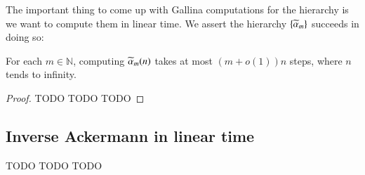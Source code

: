 The important thing to come up with Gallina computations for the hierarchy is we want to compute them in linear time. We assert the hierarchy $\left\{\widetilde{\alpha}_m\right\}$ succeeds in doing so:

\begin{thm}
For each $m \in \mathbb{N}$, computing $\widetilde{\alpha}_m(n)$ takes at most $(m + o(1))n$ steps, where $n$ tends to infinity.
\end{thm}

\begin{proof}
TODO TODO TODO
\end{proof}

\subsection{Inverse Ackermann in linear time}

TODO TODO TODO